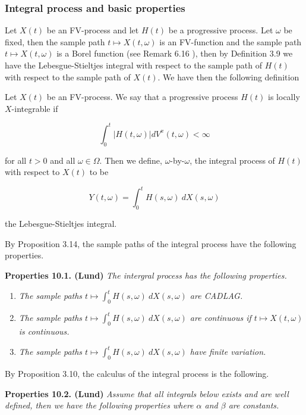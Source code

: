 \documentclass[a4paper,10pt,openany]{book}
\providecommand{\tightlist}{%
 \setlength{\itemsep}{0pt}\setlength{\parskip}{0pt}}
\begin{document}
\hypertarget{integral-process-and-basic-properties}{%
\subsubsection{Integral process and basic properties}\label{integral-process-and-basic-properties}}

Let \(X(t)\) be an FV-process and let \(H(t)\) be a progressive process. Let \(\omega\) be fixed, then the sample path \(t \mapsto X(t, \omega)\) is an FV-function and the sample path \(t \mapsto X(t, \omega)\) is a Borel function (see Remark 6.16 ), then by Definition 3.9 we have the Lebesgue-Stieltjes integral with respect to the sample path of \(H(t)\) with respect to the sample path of \(X(t)\). We have then the following definition

Let \(X(t)\) be an FV-process. We say that a progressive process \(H(t)\) is locally \(X\)-integrable if

\[
\int_0^t \vert H(t,\omega)\vert dV^x(t,\omega) <\infty
\]

for all \(t>0\) and all \(\omega \in\Omega\). Then we define, \(\omega\)-by-\(\omega\), the integral process of \(H(t)\) with respect to \(X(t)\) to be

\[
Y(t,\omega)=\int_0^tH(s,\omega)\ dX(s,\omega)
\]

the Lebesgue-Stieltjes integral.

By Proposition 3.14, the sample paths of the integral process have the following properties.

\textbf{Properties 10.1. (Lund)} \emph{The intergral process has the following properties.}

\begin{enumerate}
\def\labelenumi{(\roman{enumi})}
\tightlist
\item
  \emph{The sample paths \(t\mapsto \int_0^t H(s,\omega)\ dX(s,\omega)\) are CADLAG.}
\item
  \emph{The sample paths \(t\mapsto \int_0^t H(s,\omega)\ dX(s,\omega)\) are continuous if \(t\mapsto X(t,\omega)\) is continuous.}
\item
  \emph{The sample paths \(t\mapsto \int_0^t H(s,\omega)\ dX(s,\omega)\) have finite variation.}
\end{enumerate}

By Proposition 3.10, the calculus of the integral process is the following.

\textbf{Properties 10.2. (Lund)} \emph{Assume that all integrals below exists and are well defined, then we have the following properties where \(\alpha\) and \(\beta\) are constants.}
\end{document}
